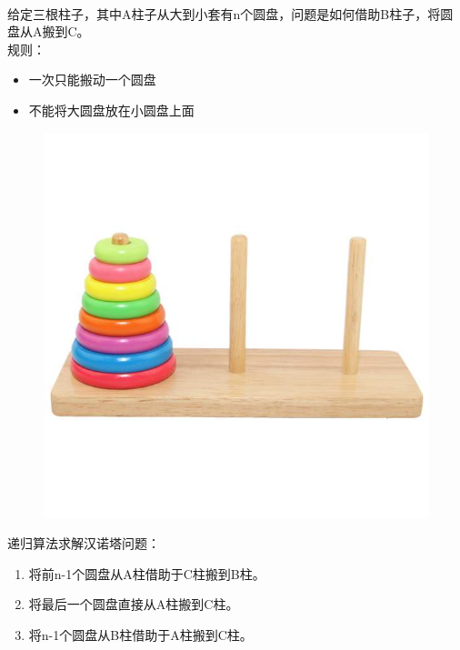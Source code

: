 \\

给定三根柱子，其中A柱子从大到小套有n个圆盘，问题是如何借助B柱子，将圆盘从A搬到C。\\

规则：

\begin{itemize}
	\item 一次只能搬动一个圆盘
	\item 不能将大圆盘放在小圆盘上面
\end{itemize}

\begin{figure}[H]
	\centering
	\includegraphics[scale=0.3]{img/C5/5-5/7.png}
\end{figure}

递归算法求解汉诺塔问题：

\begin{enumerate}
	\item 将前n-1个圆盘从A柱借助于C柱搬到B柱。
	\item 将最后一个圆盘直接从A柱搬到C柱。
	\item 将n-1个圆盘从B柱借助于A柱搬到C柱。
\end{enumerate}

